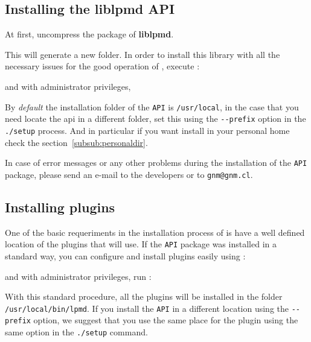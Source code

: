 \subsection{Installing the liblpmd API}

At first, uncompress the package of \textbf{liblpmd}.


This will generate a new folder. In order to install this library with all the
necessary issues for the good operation of {\lpmd}, execute :


and with administrator privileges,


By \textit{default} the installation folder of the \verb|API| is
\verb|/usr/local|, in the case that you need locate the api in a different
folder, set this using the \verb|--prefix| option in the \verb|./setup|
process. And in particular if you want install {\lpmd} in your personal home
check the section~\ref{subsub:personaldir}.

In case of error messages or any other problems during the installation of the
\verb|API| package, please send an e-mail to the developers or to
\verb|gnm@gnm.cl|.

\subsection{Installing plugins}

One of the basic requeriments in the installation process of {\lpmd} is have a
well defined location of the plugins that {\lpmd} will use. If the \verb|API|
package was installed in a standard way, you can configure and install plugins
easily using :


and with administrator privileges, run :


With this standard procedure, all the plugins will be installed in the folder
\verb|/usr/local/bin/lpmd|. If you install the \verb|API| in a different
location using the \verb|--prefix| option, we suggest that you use the same
place for the plugin using the same option in the \verb|./setup| command.


